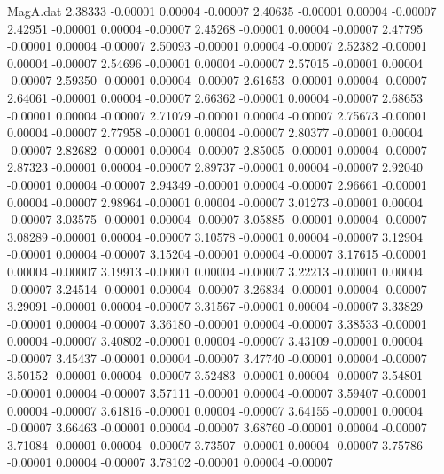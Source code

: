 \begin{filecontents}{MagA.dat}
   2.38333   -0.00001    0.00004   -0.00007
   2.40635   -0.00001    0.00004   -0.00007
   2.42951   -0.00001    0.00004   -0.00007
   2.45268   -0.00001    0.00004   -0.00007
   2.47795   -0.00001    0.00004   -0.00007
   2.50093   -0.00001    0.00004   -0.00007
   2.52382   -0.00001    0.00004   -0.00007
   2.54696   -0.00001    0.00004   -0.00007
   2.57015   -0.00001    0.00004   -0.00007
   2.59350   -0.00001    0.00004   -0.00007
   2.61653   -0.00001    0.00004   -0.00007
   2.64061   -0.00001    0.00004   -0.00007
   2.66362   -0.00001    0.00004   -0.00007
   2.68653   -0.00001    0.00004   -0.00007
   2.71079   -0.00001    0.00004   -0.00007
   2.75673   -0.00001    0.00004   -0.00007
   2.77958   -0.00001    0.00004   -0.00007
   2.80377   -0.00001    0.00004   -0.00007
   2.82682   -0.00001    0.00004   -0.00007
   2.85005   -0.00001    0.00004   -0.00007
   2.87323   -0.00001    0.00004   -0.00007
   2.89737   -0.00001    0.00004   -0.00007
   2.92040   -0.00001    0.00004   -0.00007
   2.94349   -0.00001    0.00004   -0.00007
   2.96661   -0.00001    0.00004   -0.00007
   2.98964   -0.00001    0.00004   -0.00007
   3.01273   -0.00001    0.00004   -0.00007
   3.03575   -0.00001    0.00004   -0.00007
   3.05885   -0.00001    0.00004   -0.00007
   3.08289   -0.00001    0.00004   -0.00007
   3.10578   -0.00001    0.00004   -0.00007
   3.12904   -0.00001    0.00004   -0.00007
   3.15204   -0.00001    0.00004   -0.00007
   3.17615   -0.00001    0.00004   -0.00007
   3.19913   -0.00001    0.00004   -0.00007
   3.22213   -0.00001    0.00004   -0.00007
   3.24514   -0.00001    0.00004   -0.00007
   3.26834   -0.00001    0.00004   -0.00007
   3.29091   -0.00001    0.00004   -0.00007
   3.31567   -0.00001    0.00004   -0.00007
   3.33829   -0.00001    0.00004   -0.00007
   3.36180   -0.00001    0.00004   -0.00007
   3.38533   -0.00001    0.00004   -0.00007
   3.40802   -0.00001    0.00004   -0.00007
   3.43109   -0.00001    0.00004   -0.00007
   3.45437   -0.00001    0.00004   -0.00007
   3.47740   -0.00001    0.00004   -0.00007
   3.50152   -0.00001    0.00004   -0.00007
   3.52483   -0.00001    0.00004   -0.00007
   3.54801   -0.00001    0.00004   -0.00007
   3.57111   -0.00001    0.00004   -0.00007
   3.59407   -0.00001    0.00004   -0.00007
   3.61816   -0.00001    0.00004   -0.00007
   3.64155   -0.00001    0.00004   -0.00007
   3.66463   -0.00001    0.00004   -0.00007
   3.68760   -0.00001    0.00004   -0.00007
   3.71084   -0.00001    0.00004   -0.00007
   3.73507   -0.00001    0.00004   -0.00007
   3.75786   -0.00001    0.00004   -0.00007
   3.78102   -0.00001    0.00004   -0.00007

\end{filecontents}
